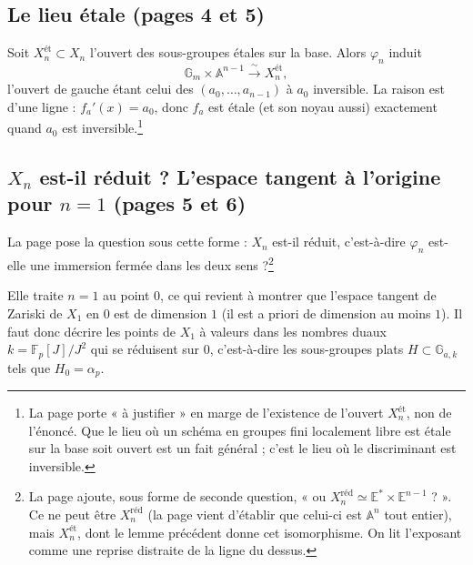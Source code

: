 \documentclass[11pt,a4paper]{article}
\begin{document}
\subsection*{Le lieu étale (pages 4 et 5)}

Soit $X_n^{\text{ét}} \subset X_n$ l'ouvert des sous-groupes étales sur la
base. Alors $\varphi_n$ induit
\[
  \mathbb{G}_m \times \mathbb{A}^{n-1} \xrightarrow{\ \sim\ }
  X_n^{\text{ét}} ,
\]
l'ouvert de gauche étant celui des $(a_0, \dots, a_{n-1})$ à $a_0$
inversible. La raison est d'une ligne : $f_a'(x) = a_0$, donc $f_a$ est étale
(et son noyau aussi) exactement quand $a_0$ est
inversible.\footnote{La page porte « à justifier » en marge de l'existence de
l'ouvert $X_n^{\text{ét}}$, non de l'énoncé. Que le lieu où un schéma en
groupes fini localement libre est étale sur la base soit ouvert est un fait
général ; c'est le lieu où le discriminant est inversible.}

\subsection*{$X_n$ est-il réduit ? L'espace tangent à l'origine pour $n = 1$ (pages 5 et 6)}

La page pose la question sous cette forme : $X_n$ est-il réduit, c'est-à-dire
$\varphi_n$ est-elle une immersion fermée dans les deux sens ?\footnote{La
page ajoute, sous forme de seconde question, « ou $X_n^{\mathrm{réd}}
\simeq \mathbb{E}^* \times \mathbb{E}^{n-1}$ ? ». Ce ne peut être
$X_n^{\mathrm{réd}}$ (la page vient d'établir que celui-ci est $\mathbb{A}^n$
tout entier), mais $X_n^{\text{ét}}$, dont le lemme précédent donne
cet isomorphisme. On lit l'exposant comme une reprise distraite
de la ligne du dessus.}

Elle traite $n = 1$ au point $0$, ce qui revient à montrer que l'espace
tangent de Zariski de $X_1$ en $0$ est de dimension $1$ (il est a priori de
dimension au moins $1$). Il faut donc décrire les points de $X_1$ à valeurs
dans les nombres duaux $k = \mathbb{F}_p[J]/J^2$ qui se réduisent sur $0$,
c'est-à-dire les sous-groupes plats $H \subset \mathbb{G}_{a,k}$ tels que
$H_0 = \alpha_p$.
\end{document}

